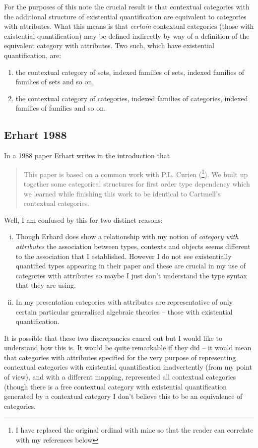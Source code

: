 \documentclass[10pt,a4paper]{article}
\begin{document}
For the purposes of this note the crucial result is that contextual categories with the additional structure of existential quantification are equivalent to categories with attributes.
What this means is that \textit{certain} contextual 
categories (those with existential quantification) may be defined indirectly by way of a definition of the equivalent category with attributes. Two such, which have existential quantification, are:
\begin{enumerate}
\item the contextual category  of sets, indexed families of sets, indexed families of families of sets and so on,
\item the contextual category of categories, indexed families of categories, indexed families of families and so on.
\end{enumerate}


\subsection{Erhart 1988}
In a 1988 paper Erhart \cite{erhard88} writes in the introduction that
\begin{quote}
This paper is based on a common work with P.L. Curien (\cite{curien89}\footnote{I have replaced the original ordinal with mine so that the reader can correlate with my references below}). We built up together some categorical structures for first order type dependency which we learned while finishing this work to be identical to Cartmell's contextual categories.
\end{quote}
\noindent
Well, I am confused by this for two distinct reasons:
\begin{enumerate} [(i)]
\item Though Erhard does show a relationship with my notion of \textit{category with attributes} 
the association between types, contexts and objects seems different to the association that I 
established. However I do not see existentially quantified types appearing in their paper and these are crucial in my use of categories with attributes so maybe I just don't understand the 
type syntax that they are using.
\item In my presentation categories with attributes are representative of only certain particular generalised algebraic theories -- those with existential quantification.
\end{enumerate}
It is possible that these two discrepancies cancel out but I would like to understand how this is. It would be quite remarkable if they did -- it would mean that  categories with attributes specified for the very purpose of representing contextual categories with existential quantification inadvertently (from my point of view), and with a different mapping, represented all contextual categories (though there is a free contextual category with existential quantification generated by a contextual category I don't believe this to be an equivalence of categories.
\end{document}

